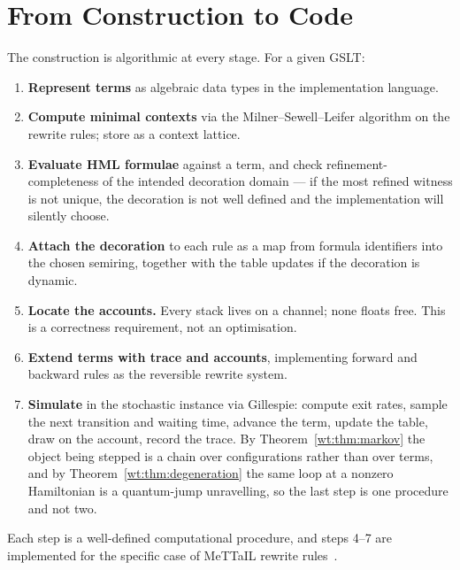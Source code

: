 \section{From Construction to Code}

The construction is algorithmic at every stage.  For a given GSLT:

\begin{enumerate}[itemsep=4pt]
  \item \textbf{Represent terms} as algebraic data types in the
        implementation language.

  \item \textbf{Compute minimal contexts} via the Milner--Sewell--Leifer
        algorithm on the rewrite rules; store as a context lattice.

  \item \textbf{Evaluate HML formulae} against a term, and check
        refinement-completeness of the intended decoration domain --- if
        the most refined witness is not unique, the decoration is not
        well defined and the implementation will silently choose.

  \item \textbf{Attach the decoration} to each rule as a map from formula
        identifiers into the chosen semiring, together with the table
        updates if the decoration is dynamic.

  \item \textbf{Locate the accounts.}  Every stack lives on a channel;
        none floats free.  This is a correctness requirement, not an
        optimisation.

  \item \textbf{Extend terms with trace and accounts}, implementing
        forward and backward rules as the reversible rewrite system.

  \item \textbf{Simulate} in the stochastic instance via Gillespie:
        compute exit rates, sample the next transition and waiting time,
        advance the term, update the table, draw on the account, record
        the trace.  By Theorem~\ref{wt:thm:markov} the object being
        stepped is a chain over configurations rather than over terms, and
        by Theorem~\ref{wt:thm:degeneration} the same loop at a nonzero
        Hamiltonian is a quantum-jump unravelling, so the last step is one
        procedure and not two.
\end{enumerate}

Each step is a well-defined computational procedure, and steps 4--7 are
implemented for the specific case of MeTTaIL rewrite
rules~\cite{StochSim}.


